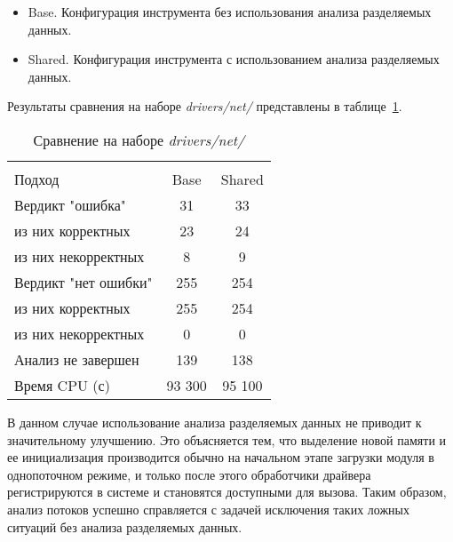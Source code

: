 \begin{itemize}
\item Base. Конфигурация инструмента без использования анализа разделяемых данных.
\item Shared. Конфигурация инструмента с использованием анализа разделяемых данных.
\end{itemize}

Результаты сравнения на наборе \textit{drivers/net/} представлены в таблице~\ref{table-drivers-shared}.

  \begin{table}[h]\footnotesize \centering
    \caption{Сравнение на наборе \textit{drivers/net/}}
  	\label{table-drivers-shared}
    \begin{tabular}{ | l | c | c |}
      \hline
      		& 		\multicolumn{2}{c|}{\combatmode}  \\
      Подход         				& Base 	& Shared 	\\ \hline
      Вердикт "ошибка" 				& 31   	& 33    	\\ 
  \hspace{0.5cm} из них корректных 	& 23 	& 24 		\\ 
  \hspace{0.5cm} из них некорректных & 8 	& 9 		\\ \hline
      Вердикт "нет ошибки"  		& 255   & 254    	\\ 
  \hspace{0.5cm} из них корректных 	& 255 	& 254    	\\
  \hspace{0.5cm} из них некорректных & 0 	& 0    		\\ \hline
      Анализ не завершен       		& 139    & 138     	\\ \hline
      Время CPU (с)   				& 93 300 & 95 100  	\\ 
      \hline
    \end{tabular}
  \end{table}

В данном случае использование анализа разделяемых данных не приводит к значительному улучшению.
Это объясняется тем, что выделение новой памяти и ее инициализация производится обычно на начальном этапе загрузки модуля в однопоточном режиме, и только после этого обработчики драйвера регистрируются в системе и становятся доступными для вызова. 
Таким образом, анализ потоков успешно справляется с задачей исключения таких ложных ситуаций без анализа разделяемых данных.

